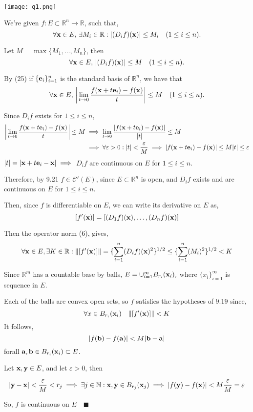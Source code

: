 \documentclass{article}
\newcommand\N{\mathbb{N}}
\newcommand\R{\mathbb{R}}
\begin{document}
\texttt{[image: q1.png]}


We're given $f:E\subset \R^n\rightarrow\R$, such that,
\[\forall \vb{x}\in E,\,\exists M_i\in \R:  |(D_i
f)(\vb{x})| \leq M_i\quad  (1\leq i\leq n).\]

Let $M = \max \{M_1,\dots, M_n\}$, then
\[\forall \vb{x}\in E,\,  |(D_i
f)(\vb{x})| \leq M \quad  (1\leq i\leq n).\]

By (25) if $\{\vb{e}_i\}_{i=1}^n$ is the
standard basis of $\R^n$, we have that
\[\forall \vb{x}\in E,\,  \bigg|\lim_{t\rightarrow 0}
  \frac{f(\vb{x}+t\vb{e}_i) - f(\vb{x})}{t}\bigg| \leq M \quad  (1\leq
  i\leq n).\]

Since $D_i f$ exists for $1\leq i \leq n$,
\begin{align*}
  \bigg|\lim_{t\rightarrow 0}
  \frac{f(\vb{x}+t\vb{e}_i) - f(\vb{x})}{t}\bigg| \leq M
  &\implies  \lim_{t\rightarrow 0}
    \frac{|f(\vb{x}+t\vb{e}_i) - f(\vb{x})|}{|t|} \leq M\\
  &\implies \forall \varepsilon > 0 : |t|<\frac{\varepsilon}{M} \implies  {|f(\vb{x}+t\vb{e}_i) -
    f(\vb{x})|} \leq M |t| \leq  \varepsilon\\
\end{align*}
$|t| = |\vb{x}+t\vb{e}_i -\vb{x}|\implies $  $D_i f$ are continuous on $E$ for $1\leq i\leq n$.

Therefore, by 9.21 $f\in \mathcal{C}'(E)$, since $E\subset \R^n$ is open, and $D_i f$ exists
and are continuous on $E$ for $1\leq i \leq n$.

Then, since $f$ is differentiable on $E$, we can write its derivative
on $E$
as,
\[[f'(\vb{x})] =[ (D_1 f)(\vb{x}) ,\dots, (D_n f)(\vb{x})]\]

Then the operator norm (6), gives,
$$\forall \vb{x}\in E, \exists K \in \R: \|[f'(\vb{x})]\|
  = \{\sum_{i=1}^n (D_i f)(\vb{x})^2\}^{1/2} \leq \{\sum_{i=1}^n
  (M_i)^2\}^{1/2} < K$$

Since $\R^m$ has a countable base by balls, $E =
\cup_{i=1}^\infty B_{r_i}(\vb{x}_i),$ where $  \{x_i\}_{i=1}^\infty$
is sequence in $E$.

Each of the balls are convex open sets, so $f$ satisfies the hypotheses of 9.19 since,
\[\forall x \in B_{r_i}(\vb{x}_i)\quad  \|[f'(\vb{x})]\| < K \]
It follows,
\[|f(\vb{b}) - f(\vb{a})| < M |\vb{b}-\vb{a}|\]
forall $\vb{a},\vb{b} \in B_{r_i}(\vb{x}_i) \subset E$.

Let $\vb{x},\vb{y}\in E$, and let $\varepsilon >0$, then

\[|\vb{y} -\vb{x}|<\frac{\varepsilon}{M}<r_j \implies \exists
  j \in \N:  \vb{x},\vb{y} \in  B_{r_j}(\vb{x}_j) \implies |f(\vb{y}) -
  f(\vb{x})| < M\frac{\varepsilon}{M} = \varepsilon\]

So, $f$ is continuous on $E\quad \blacksquare$
\end{document}
